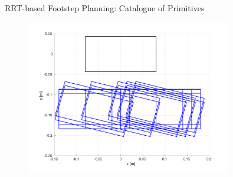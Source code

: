\documentclass[10pt]{beamer}
\begin{document}
\begin{frame}{RRT-based Footstep Planning: Catalogue of Primitives}
	\begin{figure}
			\centering
			\includegraphics[width=0.8\textwidth]{figures/catalogue-primitives.pdf}
	\end{figure}
\end{frame}
\end{document}
